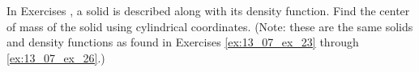 {\noindent In Exercises} 
{,  a solid is described along with its density function. Find the center of mass of the solid using  cylindrical coordinates. (Note: these are the same solids and density functions as found in Exercises \ref{ex:13_07_ex_23} through \ref{ex:13_07_ex_26}.) 
}
